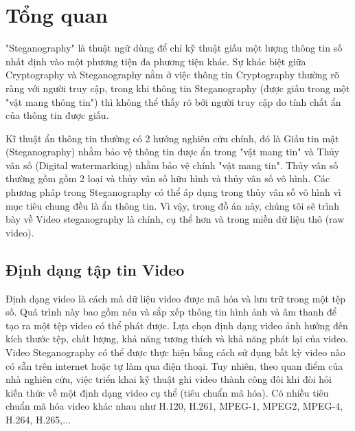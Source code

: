\chapter{Tổng quan} 
\label{sec_introduction}

"Steganography" là thuật ngữ dùng để chỉ kỹ thuật giấu một lượng thông tin số nhất định vào một phương tiện đa phương tiện khác. Sự khác biệt giữa Cryptography và Steganography nằm ở việc thông tin Cryptography thường rõ ràng với người truy cập, trong khi thông tin Steganography (được giấu trong một "vật mang thông tin") thì không thể thấy rõ bởi người truy cập do tính chất ẩn của thông tin được giấu. 

Kĩ thuật ẩn thông tin thường có 2 hướng nghiên cứu chính, đó là Giấu tin mật (Steganography) nhằm bảo vệ thông tin được ẩn trong "vật mang tin" và Thủy vân số (Digital watermarking) nhằm bảo vệ chính "vật mang tin". Thủy vân số thường gồm gồm 2 loại và thủy vân số hữu hình và thủy vân số vô hình. Các phương pháp trong Steganography có thể áp dụng trong thủy vân số vô hình vì mục tiêu chung đều là ẩn thông tin. Vì vậy, trong đồ án này, chúng tôi sẽ trình bày về Video steganography là chính, cụ thể hơn và trong miền dữ liệu thô (raw video).

\section{Định dạng tập tin Video}
Định dạng video là cách mà dữ liệu video được mã hóa và lưu trữ trong một tệp số. Quá trình này bao gồm nén và sắp xếp thông tin hình ảnh và âm thanh để tạo ra một tệp video có thể phát được. Lựa chọn định dạng video ảnh hưởng đến kích thước tệp, chất lượng, khả năng tương thích và khả năng phát lại của video. 
Video Steganography có thể được thực hiện bằng cách sử dụng bất kỳ video nào có sẵn trên internet hoặc tự làm qua điện thoại. Tuy nhiên, theo quan điểm của nhà nghiên cứu, việc triển khai kỹ thuật ghi video thành công đôi khi đòi hỏi kiến thức về một định dạng video cụ thể (tiêu chuẩn mã hóa). Có nhiều tiêu chuẩn mã hóa video khác nhau như H.120, H.261, MPEG-1, MPEG2, MPEG-4, H.264, H.265,...

